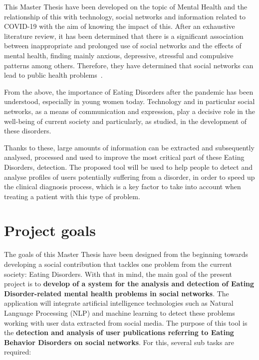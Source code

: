 



This Master Thesis have been developed on the topic of Mental Health and the relationship of this with technology, social networks and information related to COVID-19 with the aim of knowing the impact of this. After an exhaustive literature review, it has been determined that there is a significant association between inappropriate and prolonged use of social networks and the effects of mental health, finding mainly anxious, depressive, stressful and compulsive patterns among others. Therefore, they have determined that social networks can lead to public health problems~\cite{pozo2022impacto}.

From the above, the importance of Eating Disorders after the pandemic has been understood, especially in young women today. Technology and in particular social networks, as a means of communication and expression, play a decisive role in the well-being of current society and particularly, as studied, in the development of these disorders.

Thanks to these, large amounts of information can be extracted and subsequently analysed, processed and used to improve the most critical part of these Eating Disorders, detection. The proposed tool will be used to help people to detect and analyse profiles of users potentially suffering from a disorder, in order to speed up the clinical diagnosis process, which is a key factor to take into account when treating a patient with this type of problem.


\section{Project goals}
\label{sec:goals}
The goals of this Master Thesis have been designed from the beginning towards developing a social contribution that tackles one problem from the current society: Eating Disorders. With that in mind, the main goal of the present project is to \textbf{develop of a system for the analysis and detection of Eating Disorder-related mental health problems in social networks}. The application will integrate artificial intelligence technologies such as Natural Language Processing (NLP) and machine learning to detect these problems working with user data extracted from social media. The purpose of this tool is the \textbf{detection and analysis of user publications referring to Eating Behavior Disorders on social networks}. For this, several sub tasks are required:

